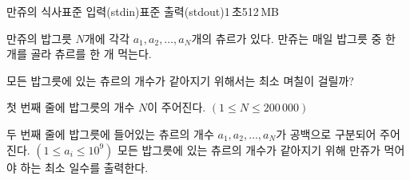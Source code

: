 \begin{problem}{만쥬의 식사}{표준 입력(stdin)}{표준 출력(stdout)}{1\,초}{512\,MB}

만쥬의 밥그릇 $N$개에 각각 $a_1, a_2, \dots, a_N$개의 츄르가 있다. 만쥬는 매일 밥그릇 중 한 개를 골라 츄르를 한 개 먹는다. 

모든 밥그릇에 있는 츄르의 개수가 같아지기 위해서는 최소 며칠이 걸릴까?

\InputFile
첫 번째 줄에 밥그릇의 개수 $ N $이 주어진다. $(1\le N \le 200\,000)$

두 번째 줄에 밥그릇에 들어있는 츄르의 개수 $a_1, a_2, \dots, a_N$가 공백으로 구분되어 주어진다. $(1 \le a_i \le 10^9)$
\OutputFile
모든 밥그릇에 있는 츄르의 개수가 같아지기 위해 만쥬가 먹어야 하는 최소 일수를 출력한다.

\Examples

\begin{example}
%
%
\end{example}

\end{problem}
